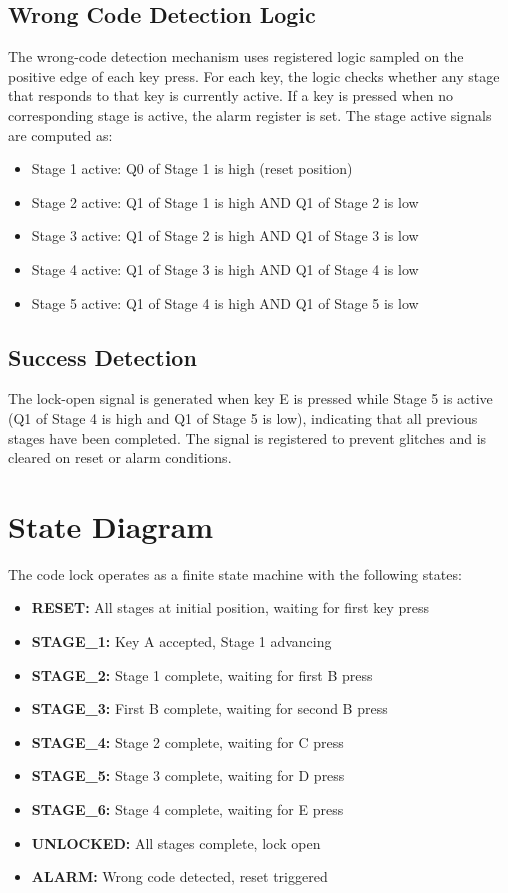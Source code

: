 \documentclass[12pt,a4paper]{report}
\begin{document}
\subsection{Wrong Code Detection Logic}

The wrong-code detection mechanism uses registered logic sampled on the positive edge of each key press. For each key, the logic checks whether any stage that responds to that key is currently active. If a key is pressed when no corresponding stage is active, the alarm register is set. The stage active signals are computed as:

\begin{itemize}
    \item Stage 1 active: Q0 of Stage 1 is high (reset position)
    \item Stage 2 active: Q1 of Stage 1 is high AND Q1 of Stage 2 is low
    \item Stage 3 active: Q1 of Stage 2 is high AND Q1 of Stage 3 is low
    \item Stage 4 active: Q1 of Stage 3 is high AND Q1 of Stage 4 is low
    \item Stage 5 active: Q1 of Stage 4 is high AND Q1 of Stage 5 is low
\end{itemize}

\subsection{Success Detection}

The lock-open signal is generated when key E is pressed while Stage 5 is active (Q1 of Stage 4 is high and Q1 of Stage 5 is low), indicating that all previous stages have been completed. The signal is registered to prevent glitches and is cleared on reset or alarm conditions.

\section{State Diagram}

The code lock operates as a finite state machine with the following states:

\begin{itemize}
    \item \textbf{RESET:} All stages at initial position, waiting for first key press
    \item \textbf{STAGE\_1:} Key A accepted, Stage 1 advancing
    \item \textbf{STAGE\_2:} Stage 1 complete, waiting for first B press
    \item \textbf{STAGE\_3:} First B complete, waiting for second B press
    \item \textbf{STAGE\_4:} Stage 2 complete, waiting for C press
    \item \textbf{STAGE\_5:} Stage 3 complete, waiting for D press
    \item \textbf{STAGE\_6:} Stage 4 complete, waiting for E press
    \item \textbf{UNLOCKED:} All stages complete, lock open
    \item \textbf{ALARM:} Wrong code detected, reset triggered
\end{itemize}
\end{document}
